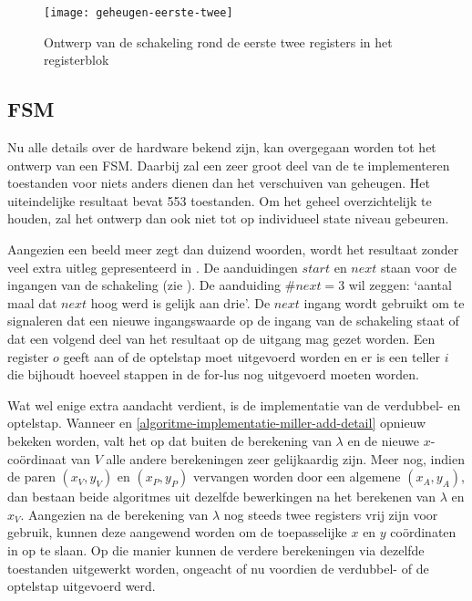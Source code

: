 \begin{figure}[h]
	\centering
		\texttt{[image: geheugen-eerste-twee]}
		\caption{Ontwerp van de schakeling rond de eerste twee registers in het registerblok\label{figuur-implementatie-geheugen-eerste-twee}}
\end{figure}

\subsection{FSM}

Nu alle details over de hardware bekend zijn, kan overgegaan worden tot het ontwerp van een FSM. Daarbij zal een zeer groot deel van de te implementeren toestanden voor niets anders dienen dan het verschuiven van geheugen. Het uiteindelijke resultaat bevat 553 toestanden. Om het geheel overzichtelijk te houden, zal het ontwerp dan ook niet tot op individueel state niveau gebeuren.

Aangezien een beeld meer zegt dan duizend woorden, wordt het resultaat zonder veel extra uitleg gepresenteerd in . De aanduidingen $start$ en $next$ staan voor de ingangen van de schakeling (zie ). De aanduiding $\#next = 3$ wil zeggen: `aantal maal dat $next$ hoog werd is gelijk aan drie'. De $next$ ingang wordt gebruikt om te signaleren dat een nieuwe ingangswaarde op de ingang van de schakeling staat of dat een volgend deel van het resultaat op de uitgang mag gezet worden. Een register $o$ geeft aan of de optelstap moet uitgevoerd worden en er is een teller $i$ die bijhoudt hoeveel stappen in de for-lus nog uitgevoerd moeten worden.

Wat wel enige extra aandacht verdient, is de implementatie van de verdubbel- en optelstap. Wanneer  en \ref{algoritme-implementatie-miller-add-detail} opnieuw bekeken worden, valt het op dat buiten de berekening van $\lambda$ en de nieuwe $x$-co\"ordinaat van $V$ alle andere berekeningen zeer gelijkaardig zijn. Meer nog, indien de paren $(x_V, y_V)$ en $(x_P, y_P)$ vervangen worden door een algemene $(x_A, y_A)$, dan bestaan beide algoritmes uit dezelfde bewerkingen na het berekenen van $\lambda$ en $x_V$. Aangezien na de berekening van $\lambda$ nog steeds twee registers vrij zijn voor gebruik, kunnen deze aangewend worden om de toepasselijke $x$ en $y$ co\"ordinaten in op te slaan. Op die manier kunnen de verdere berekeningen via dezelfde toestanden uitgewerkt worden, ongeacht of nu voordien de verdubbel- of de optelstap uitgevoerd werd.


